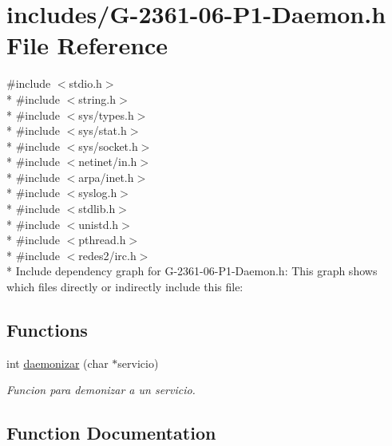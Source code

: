 \hypertarget{_g-2361-06-_p1-_daemon_8h}{}\section{includes/\+G-\/2361-\/06-\/\+P1-\/\+Daemon.h File Reference}
\label{_g-2361-06-_p1-_daemon_8h}
{\ttfamily \#include $<$stdio.\+h$>$}\\*
{\ttfamily \#include $<$string.\+h$>$}\\*
{\ttfamily \#include $<$sys/types.\+h$>$}\\*
{\ttfamily \#include $<$sys/stat.\+h$>$}\\*
{\ttfamily \#include $<$sys/socket.\+h$>$}\\*
{\ttfamily \#include $<$netinet/in.\+h$>$}\\*
{\ttfamily \#include $<$arpa/inet.\+h$>$}\\*
{\ttfamily \#include $<$syslog.\+h$>$}\\*
{\ttfamily \#include $<$stdlib.\+h$>$}\\*
{\ttfamily \#include $<$unistd.\+h$>$}\\*
{\ttfamily \#include $<$pthread.\+h$>$}\\*
{\ttfamily \#include $<$redes2/irc.\+h$>$}\\*
Include dependency graph for G-\/2361-\/06-\/\+P1-\/\+Daemon.h\+:
This graph shows which files directly or indirectly include this file\+:
\subsection*{Functions}
\begin{DoxyCompactItemize}
\item 
int \hyperlink{_g-2361-06-_p1-_daemon_8h_ae983f3eb0ff5cebb14c2ae123043df39}{daemonizar} (char $\ast$servicio)
\begin{DoxyCompactList}\small\item\em Funcion para demonizar a un servicio. \end{DoxyCompactList}\end{DoxyCompactItemize}


\subsection{Function Documentation}
